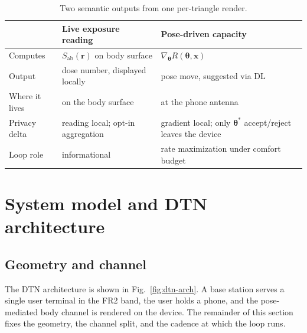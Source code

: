 \documentclass[journal,twocolumn,10pt]{IEEEtran}
\theoremstyle{plain}
\theoremstyle{definition}
\theoremstyle{remark}
\newcommand{\rr}{\mathbf{r}}
\newcommand{\xx}{\mathbf{x}}
\newcommand{\Sab}{S_{\mathrm{ab}}}
\newcommand{\thetab}{\bm{\theta}}
\begin{document}
\begin{table}[!t]
\caption{Two semantic outputs from one per-triangle render.}
\label{tab:two-products}
\centering\small
\begin{tabular}{@{}p{}p{}p{}@{}}
\toprule
& \textbf{Live exposure reading} & \textbf{Pose-driven capacity} \\
\midrule
Computes & $\Sab(\rr)$ on body surface & $\nabla_{\thetab} R(\thetab,\xx)$ \\
Output & dose number, displayed locally & pose move, suggested via DL \\
Where it lives & on the body surface & at the phone antenna \\
Privacy delta & reading local; opt-in aggregation & gradient local; only $\thetab^{*}$ accept/reject leaves the device \\
Loop role & informational & rate maximization under comfort budget \\
\bottomrule
\end{tabular}
\end{table}


\section{System model and DTN architecture}\label{sec:arch}

\subsection{Geometry and channel}

The DTN architecture is shown in Fig.~\ref{fig:dtn-arch}. A base
station serves a single user terminal in the FR2 band, the user
holds a phone, and the pose-mediated body channel is rendered on
the device. The remainder of this section fixes the geometry, the
channel split, and the cadence at which the loop runs.
\end{document}
